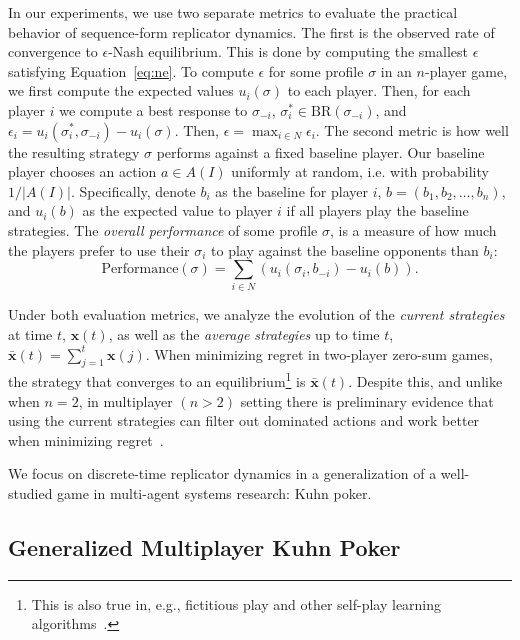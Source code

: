 \documentclass{aamas2014}
\newcommand{\bx}{\mathbf{x}}
\newcommand{\BR}{\mbox{BR}}
\begin{document}
In our experiments, we use two separate metrics to evaluate the practical behavior of sequence-form replicator dynamics. 
The first is the observed rate of convergence to $\epsilon$-Nash equilibrium. This is done by computing the smallest 
$\epsilon$ satisfying Equation~\ref{eq:ne}. To compute $\epsilon$ for some profile $\sigma$ in an $n$-player game, we first
compute the expected values $u_i(\sigma)$ to each player. 
Then, for each player $i$ we compute a best response to $\sigma_{-i}$, $\sigma^*_i \in \BR(\sigma_{-i})$, and 
$\epsilon_i = u_i(\sigma^*_i, \sigma_{-i}) - u_i(\sigma)$. Then, $\epsilon = \max_{i \in N} \epsilon_i$. 
The second metric is how well the resulting strategy $\sigma$ performs against a fixed baseline player. Our baseline player 
chooses an action $a \in A(I)$ uniformly at random, i.e. with probability $1/|A(I)|$. Specifically, denote 
$b_i$ as the baseline for player $i$, $b = (b_1, b_2, \ldots, b_n)$, and $u_i(b)$ as the expected value to player $i$
if all players play the baseline strategies. The {\it overall performance} of some profile $\sigma$,  is a measure of how 
much the players prefer to use their $\sigma_i$ to play against the baseline opponents than $b_i$:
\begin{equation}
\mbox{Performance}(\sigma) = \sum_{i \in N} \left( u_i(\sigma_i, b_{-i}) - u_i(b) \right).
\end{equation}

Under both evaluation metrics, we analyze the evolution of the {\it current strategies} at time $t$, $\bx(t)$, as well 
as the {\it average strategies} up to time $t$, $\bar{\bx}(t) = \sum_{j=1}^t \bx(j)$. When minimizing regret in 
two-player zero-sum games, the strategy that converges to an equilibrium\footnote{This is also true in, e.g., fictitious play and other self-play learning algorithms~\cite{FudLev98}.} 
is $\bar{\bx}(t)$. 
Despite this, and unlike when $n = 2$, 
in multiplayer $(n > 2)$ setting there is preliminary evidence that using the current strategies can filter out dominated actions
and work better when minimizing regret~\cite{Gibson13domination}. 

We focus on discrete-time replicator dynamics in a generalization of a well-studied game in multi-agent systems research: Kuhn poker. 

\subsection{Generalized Multiplayer Kuhn Poker}
\end{document}
